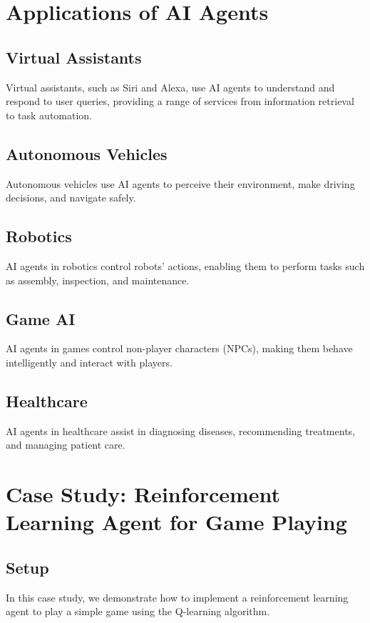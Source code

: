 \section{Applications of AI Agents}

\subsection{Virtual Assistants}
Virtual assistants, such as Siri and Alexa, use AI agents to understand and respond to user queries, providing a range of services from information retrieval to task automation.

\subsection{Autonomous Vehicles}
Autonomous vehicles use AI agents to perceive their environment, make driving decisions, and navigate safely.

\subsection{Robotics}
AI agents in robotics control robots' actions, enabling them to perform tasks such as assembly, inspection, and maintenance.

\subsection{Game AI}
AI agents in games control non-player characters (NPCs), making them behave intelligently and interact with players.

\subsection{Healthcare}
AI agents in healthcare assist in diagnosing diseases, recommending treatments, and managing patient care.

\section{Case Study: Reinforcement Learning Agent for Game Playing}

\subsection{Setup}
In this case study, we demonstrate how to implement a reinforcement learning agent to play a simple game using the Q-learning algorithm.


